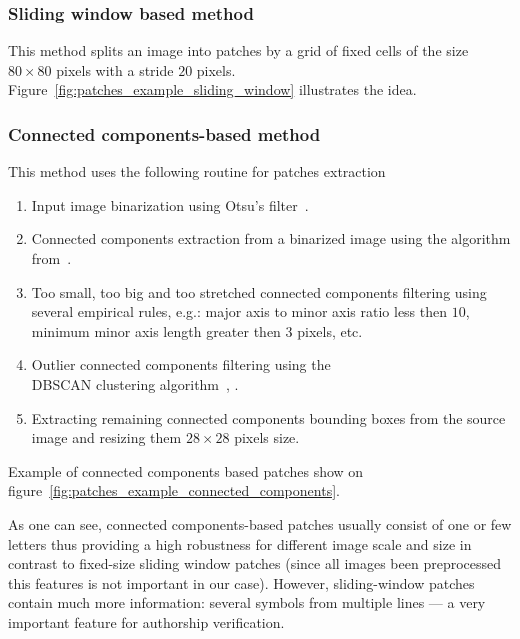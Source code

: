 \documentclass[conference,a4paper,twocolumn]{IEEEtran}
\begin{document}
\subsubsection{Sliding window based method}
This method splits an image into patches by a grid of fixed cells of the size $80\times 80$ pixels with a stride $20$ pixels. Figure~\ref{fig:patches_example_sliding_window} illustrates the idea. 

\subsubsection{Connected components-based method}
This method uses the following routine for patches extraction

\begin{enumerate}
	\item Input image binarization using Otsu's filter~\cite{otsu1975threshold}.
	\item Connected components extraction from a binarized image using the algorithm from~\cite{fiorio1996connected_components}.
	\item Too small, too big and too stretched connected components filtering using several empirical rules, e.g.: major axis to minor axis ratio less then $10$, minimum minor axis length greater then $3$ pixels, etc.
	\item Outlier connected components filtering using the\\ DBSCAN clustering algorithm~\cite{ester1996dbscan}, \cite{GranVolk}.
	\item Extracting remaining connected components bounding boxes from the source image and resizing them $28\times 28$ pixels size.
\end{enumerate}

Example of connected components based patches show on figure~\ref{fig:patches_example_connected_components}. 

As one can see, connected components-based patches usually consist of one or few letters thus providing a high robustness for different image scale and size in contrast to fixed-size sliding window patches (since all images been preprocessed this features is not important in our case). However, sliding-window patches contain much more information: several symbols from multiple lines --- a very important feature for authorship verification.
%
\end{document}
